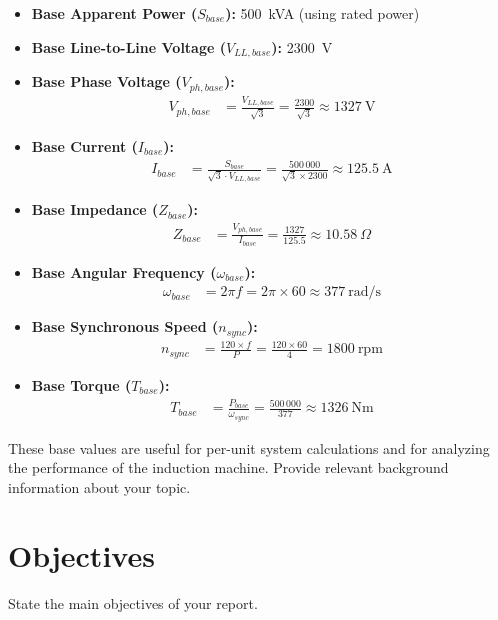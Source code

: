 \documentclass[12pt,a4paper]{report}
\begin{document}
\begin{itemize}
    \item \textbf{Base Apparent Power ($S_{base}$):} 500~kVA (using rated power)
    \item \textbf{Base Line-to-Line Voltage ($V_{LL,base}$):} 2300~V
    \item \textbf{Base Phase Voltage ($V_{ph,base}$):}
    \begin{align*}
        V_{ph,base} &= \frac{V_{LL,base}}{\sqrt{3}} = \frac{2300}{\sqrt{3}} \approx 1327~\text{V}
    \end{align*}
    \item \textbf{Base Current ($I_{base}$):}
    \begin{align*}
        I_{base} &= \frac{S_{base}}{\sqrt{3} \cdot V_{LL,base}} = \frac{500\,000}{\sqrt{3} \times 2300} \approx 125.5~\text{A}
    \end{align*}
    \item \textbf{Base Impedance ($Z_{base}$):}
    \begin{align*}
        Z_{base} &= \frac{V_{ph,base}}{I_{base}} = \frac{1327}{125.5} \approx 10.58~\Omega
    \end{align*}
    \item \textbf{Base Angular Frequency ($\omega_{base}$):}
    \begin{align*}
        \omega_{base} &= 2\pi f = 2\pi \times 60 \approx 377~\text{rad/s}
    \end{align*}
    \item \textbf{Base Synchronous Speed ($n_{sync}$):}
    \begin{align*}
        n_{sync} &= \frac{120 \times f}{P} = \frac{120 \times 60}{4} = 1800~\text{rpm}
    \end{align*}
    \item \textbf{Base Torque ($T_{base}$):}
    \begin{align*}
        T_{base} &= \frac{P_{base}}{\omega_{sync}} = \frac{500\,000}{377} \approx 1326~\text{Nm}
    \end{align*}
\end{itemize}

These base values are useful for per-unit system calculations and for analyzing the performance of the induction machine.
Provide relevant background information about your topic.

\section{Objectives}
State the main objectives of your report.
\end{document}
